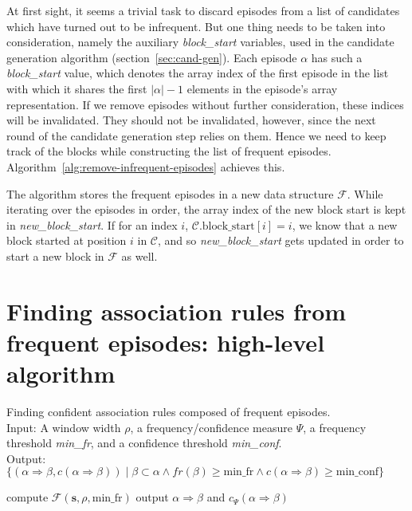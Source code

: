 At first sight, it seems a trivial task to discard episodes from a list of candidates which have turned out to be infrequent. But one thing needs to be taken into consideration, namely the auxiliary \emph{block\_start} variables, used in the candidate generation algorithm (section~\ref{sec:cand-gen}). Each episode $ \alpha $ has such a \emph{block\_start} value, which denotes the array index of the first episode in the list with which it shares the first $ | \alpha | - 1 $ elements in the episode's array representation. If we remove episodes without further consideration, these indices will be invalidated. They should not be invalidated, however, since the next round of the candidate generation step relies on them. Hence we need to keep track of the blocks while constructing the list of frequent episodes. Algorithm~\ref{alg:remove-infrequent-episodes} achieves this.

The algorithm stores the frequent episodes in a new data structure $ \mathcal{F} $. While iterating over the episodes in order, the array index of the new block start is kept in \emph{new\_block\_start}. If for an index $ i $, $ \mathcal{C}. \text{block\_start}[i] = i $, we know that a new block started at position $ i $ in $ \mathcal{C} $, and so \emph{new\_block\_start} gets updated in order to start a new block in $ \mathcal{F} $ as well.



\section{Finding association rules from frequent episodes: high-level algorithm}

\begin{algorithm}

\caption{Finding confident association rules composed of frequent episodes.\\
Input: A window width $ \rho $, a frequency/confidence measure $ \Psi $, a frequency threshold \emph{min\_fr}, and a confidence threshold \emph{min\_conf}.\\
Output: $ \{ (\alpha \Rightarrow \beta, c(\alpha \Rightarrow \beta)) \mid \beta \subset \alpha \wedge fr(\beta) \geq \text{min\_fr} \wedge c(\alpha \Rightarrow \beta) \geq \text{min\_conf} \} $
}

\begin{algorithmic}[1]

\State compute $ \mathcal{F}(\boldsymbol{s}, \rho, \text{min\_fr}) $
    \ForAll{$ \alpha \subset \beta $}
         \label{alglin:association-rules-top-level:compute-confidence}
            \State output $ \alpha \Rightarrow \beta $ and $ c_\Psi(\alpha \Rightarrow \beta) $
        \EndIf
    \EndFor
\EndFor

\end{algorithmic}

\label{alg:association-rules-top-level}
\end{algorithm}


